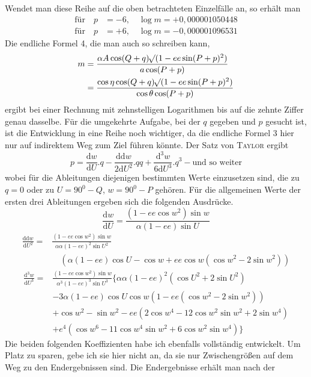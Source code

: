 %
\noindent Wendet man diese Reihe auf die oben betrachteten Einzelfälle an, so erhält man
\[
\begin{aligned}
\text{für}\quad p&=-6,\quad\log m=+0{,}000001050448\\
\text{für}\quad p&=+6,\quad\log m=-0{,}000001096531
\end{aligned}
\]
Die endliche Formel 4, die man auch so schreiben kann,
\[
\begin{aligned}
m&=\frac{\alpha A\cos(Q+q)\mathord{{}^{}\!\surd}(1-ee\sin(P+p)^2)}{a\cos(P+p)}\\
&=\frac{\cos\eta\cos(Q+q)\mathord{{}^{}\!\surd}(1-ee\sin(P+p)^2)}{\cos\theta\cos(P+p)}
\end{aligned}
\]
ergibt bei einer Rechnung mit zehnstelligen Logarithmen bis auf die zehnte Ziffer genau dasselbe.
\indent Für die umgekehrte Aufgabe, bei der \(q\) gegeben und \(p\) gesucht ist, ist die Entwicklung in eine Reihe noch wichtiger, da die endliche Formel 3 hier nur auf indirektem Weg zum Ziel führen könnte. Der Satz von \textsc{Taylor} ergibt
\[
p=\frac{\mathrm{d}w}{\mathrm{d}U}\mathord{.}q-\frac{\mathrm{dd}w}{2\mathrm{d}U^2}\mathord{.}qq+\frac{\mathrm{d}^3w}{6\mathrm{d}U^3}\mathord{.}q^3-\text{und so weiter}
\]
wobei für die Ableitungen diejenigen bestimmten Werte einzusetzen sind, die zu \(q=0\) oder zu \(U=90^0-Q\), \(w=90^0-P\) gehören. Für die allgemeinen Werte der ersten drei Ableitungen ergeben sich die folgenden Ausdrücke.
\[
\frac{\mathrm{d}w}{\mathrm{d}U}=\frac{(1-ee\cos w^2)\sin w}{\alpha(1-ee)\sin U}
\]
\[
\begin{aligned}
\frac{\mathrm{dd}w}{\mathrm{d}U^2}={}&\frac{(1-ee\cos w^2)\sin w}{\alpha\alpha(1-ee)^2\sin U^2}\\
&\quad(\alpha(1-ee)\cos U-\cos w+ee\cos w(\cos w^2-2\sin w^2))
\end{aligned}
\]
\[
\begin{aligned}
\frac{\mathrm{d}^3w}{\mathrm{d}U^3}={}&\frac{(1-ee\cos w^2)\sin w}{\alpha^3(1-ee)^3\sin U^3}\{\alpha\alpha(1-ee)^2(\cos U^2+2\sin U^2)\\
&-3\alpha(1-ee)\cos U\cos w(1-ee(\cos w^2-2\sin w^2))\\
&+\cos w^2-\sin w^2-ee(2\cos w^4-12\cos w^2\sin w^2+2\sin w^4)\\
&+e^4(\cos w^6-11\cos w^4\sin w^2+6\cos w^2\sin w^4)\}
\end{aligned}
\]
\indent Die beiden folgenden Koeffizienten habe ich ebenfalls vollständig entwickelt. Um Platz zu sparen, gebe ich sie hier nicht an, da sie nur Zwischengrößen auf dem Weg zu den Endergebnissen sind. Die Endergebnisse erhält man nach der %
